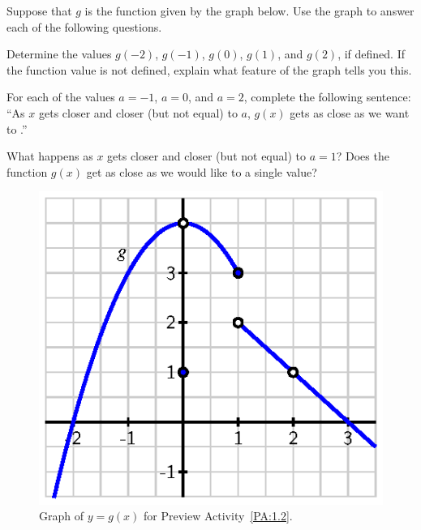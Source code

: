 \begin{pa} \label{PA:1.2}
Suppose that $g$ is the function given by the graph below.  Use the graph to answer each of the following questions. 
\ba
	\item Determine the values $g(-2)$, $g(-1)$, $g(0)$, $g(1)$, and $g(2)$, if defined.  If the function value is not defined, explain what feature of the graph tells you this.
	\item For each of the values $a = -1$, $a = 0$, and $a = 2$, complete the following sentence: ``As $x$ gets closer and closer (but not equal) to $a$, $g(x)$ gets as close as we want to \underline{\hspace{0.3in}}.''
	\item What happens as $x$ gets closer and closer (but not equal) to $a = 1$?  Does the function $g(x)$ get as close as we would like to a single value?
\ea

\begin{figure}[h]
\begin{center}
\includegraphics{figures/1_2_PA1.eps} 
\caption{Graph of $y = g(x)$ for Preview Activity~\ref{PA:1.2}.} \label{F:1.2.PA1}
\end{center}
\end{figure}

\end{pa} \afterpa